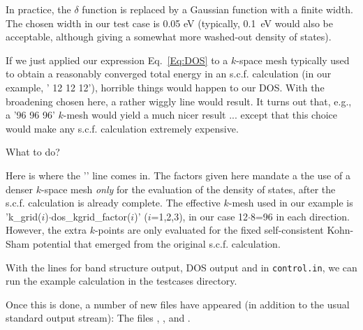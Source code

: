 In practice, the $\delta$ function is replaced by a Gaussian function
with a finite width. The chosen width in our test case is 0.05 eV
(typically, 0.1~eV would also be acceptable, although giving a
somewhat more washed-out density of states). 

If we just applied our expression Eq.~\ref{Eq:DOS} to a $k$-space mesh
typically used to obtain a reasonably converged total energy in an
s.c.f. calculation (in our example, ' 12 12 12'),
horrible things would happen to our DOS. With the broadening chosen
here, a rather wiggly line would result. It turns out that, e.g., a 
'96 96 96' $k$-mesh would yield a much nicer result ... except that
this choice would make any s.c.f. calculation extremely expensive.

What to do?

Here is where the '' line comes in. The
factors given here mandate a the use of a denser $k$-space mesh
\emph{only} for the evaluation of the density of states, after the
s.c.f. calculation is already complete. The effective $k$-mesh used in
our example is 'k\_grid($i$)$\cdot$dos\_kgrid\_factor($i$)' ($i$=1,2,3),
in our case 12$\cdot$8=96 in each direction. However, the extra $k$-points
are only evaluated for the fixed self-consistent Kohn-Sham potential
that emerged from the original s.c.f. calculation.

With the lines for band structure output, DOS output and
 in \texttt{control.in}, we can run the
example calculation in the testcases directory.

Once this is done, a number of new files have appeared (in addition to
the usual standard output stream): The files ,
, and . 

